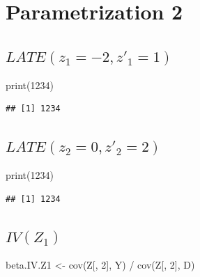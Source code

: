 \documentclass[9pt,twocolumn,twoside,]{pnas-new}
\newenvironment{Shaded}{}{}
\newcommand{\DecValTok}[1]{\textcolor[rgb]{0.25,0.63,0.44}{#1}}
\newcommand{\FunctionTok}[1]{\textcolor[rgb]{0.02,0.16,0.49}{#1}}
\newcommand{\NormalTok}[1]{#1}
\newcommand{\OtherTok}[1]{\textcolor[rgb]{0.00,0.44,0.13}{#1}}
\newcommand{\SpecialCharTok}[1]{\textcolor[rgb]{0.25,0.44,0.63}{#1}}
\begin{document}
\hypertarget{parametrization-2}{%
\section{Parametrization 2}\label{parametrization-2}}

\hypertarget{latez_1--2-z_1-1}{%
\subsection{\texorpdfstring{\(LATE(z_1 = -2, z'_1 = 1)\)}{LATE(z\_1 = -2, z'\_1 = 1)}}\label{latez_1--2-z_1-1}}

\begin{Shaded}
\begin{Highlighting}[]
\FunctionTok{print}\NormalTok{(}\DecValTok{1234}\NormalTok{)}
\end{Highlighting}
\end{Shaded}

\begin{verbatim}
## [1] 1234
\end{verbatim}

\hypertarget{latez_2-0-z_2-2}{%
\subsection{\texorpdfstring{\(LATE(z_2 = 0, z'_2 = 2)\)}{LATE(z\_2 = 0, z'\_2 = 2)}}\label{latez_2-0-z_2-2}}

\begin{Shaded}
\begin{Highlighting}[]
\FunctionTok{print}\NormalTok{(}\DecValTok{1234}\NormalTok{)}
\end{Highlighting}
\end{Shaded}

\begin{verbatim}
## [1] 1234
\end{verbatim}

\hypertarget{ivz_1}{%
\subsection{\texorpdfstring{\(IV(Z_1)\)}{IV(Z\_1)}}\label{ivz_1}}

\begin{Shaded}
\begin{Highlighting}[]
\NormalTok{beta.IV.Z1 }\OtherTok{\textless{}{-}} \FunctionTok{cov}\NormalTok{(Z[, }\DecValTok{2}\NormalTok{], Y) }\SpecialCharTok{/} \FunctionTok{cov}\NormalTok{(Z[, }\DecValTok{2}\NormalTok{], D)}
\end{Highlighting}
\end{Shaded}
\end{document}
